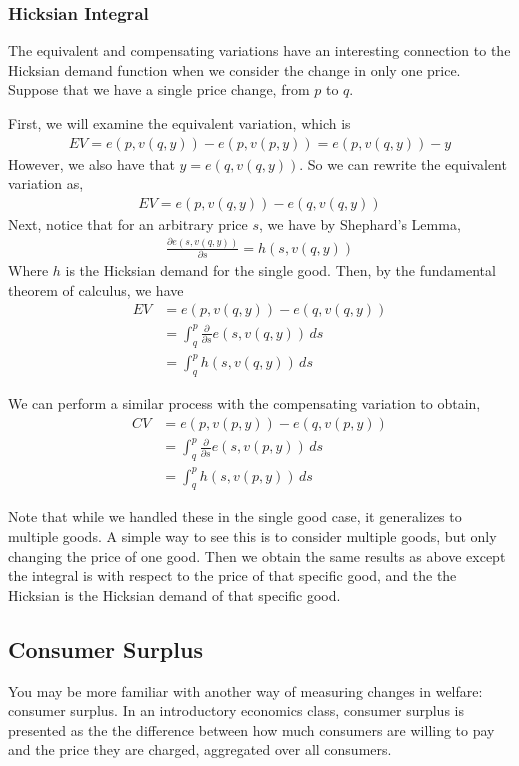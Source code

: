 \subsubsection*{Hicksian Integral}
The equivalent and compensating variations have an interesting connection to the Hicksian demand function when we consider the change in only one price.  Suppose that we have a single price change, from $p$ to $q$.

First, we will examine the equivalent variation, which is
\begin{align*}
    EV = e(p, v(q, y)) - e(p, v(p, y)) = e(p, v(q, y)) - y
\end{align*}
However, we also have that $y = e(q, v(q, y))$. So we can rewrite the equivalent variation as,
\begin{align*}
    EV = e(p, v(q, y)) - e(q, v(q, y))
\end{align*}
Next, notice that for an arbitrary price $s$, we have by Shephard's Lemma,
\begin{align*}
    \frac{\partial e(s, v(q, y))}{\partial s} = h(s, v(q, y))
\end{align*}
Where $h$ is the Hicksian demand for the single good. Then, by the fundamental theorem of calculus, we have
\begin{align*}
    EV &= e(p, v(q, y)) - e(q, v(q, y)) \\
    &= \int_q^p \frac{\partial}{\partial s} e(s, v(q, y)) \, ds \\
    &= \int_q^p h(s, v(q, y)) \, ds
\end{align*}

We can perform a similar process with the compensating variation to obtain,
\begin{align*}
    CV &= e(p, v(p, y)) - e(q, v(p, y)) \\
    &= \int_q^p \frac{\partial}{\partial s} e(s, v(p, y)) \, ds \\
    &= \int_q^p h(s, v(p, y)) \, ds
\end{align*}

Note that while we handled these in the single good case, it generalizes to multiple goods. A simple way to see this is to consider multiple goods, but only changing the price of one good. Then we obtain the same results as above except the integral is with respect to the price of that specific good, and the the Hicksian is the Hicksian demand of that specific good. 

\subsection*{Consumer Surplus}
You may be more familiar with another way of measuring changes in welfare: consumer surplus. In an introductory economics class, consumer surplus is presented as the the difference between how much consumers are willing to pay and the price they are charged, aggregated over all consumers. 

